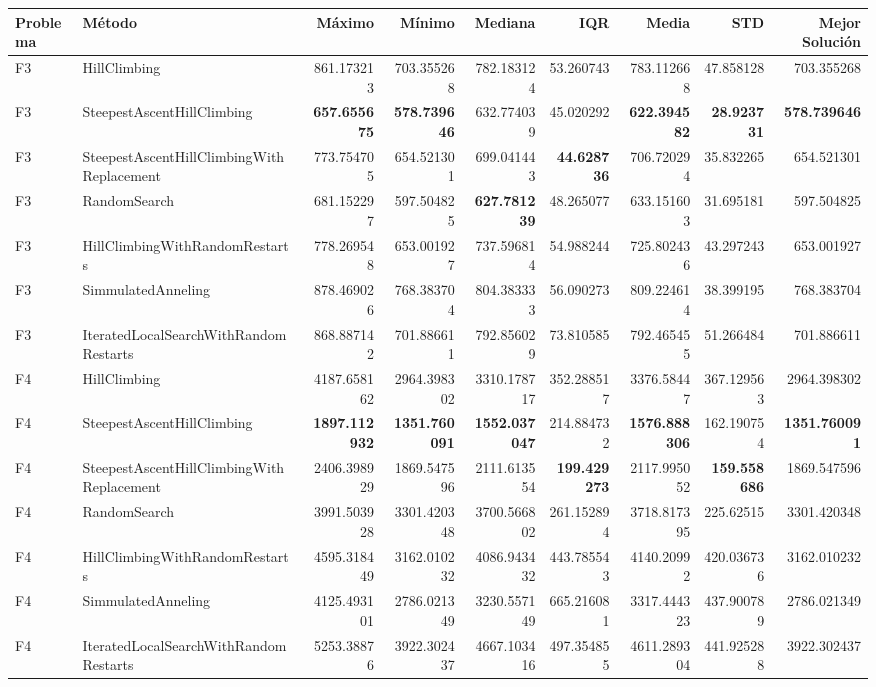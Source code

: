 \begin{tabular}{llrrrrrrr}
\toprule
Problema & Método & Máximo & Mínimo & Mediana & IQR & Media & STD & Mejor Solución \\ 
\midrule
F3 & HillClimbing & 861.173213 & 703.355268 & 782.183124 & 53.260743 & 783.112668 & 47.858128 & 703.355268 \\ 
F3 & SteepestAscentHillClimbing & \textbf{657.655675} & \textbf{578.739646} & 632.774039 & 45.020292 & \textbf{622.394582} & \textbf{28.923731} & \textbf{578.739646} \\ 
F3 & SteepestAscentHillClimbingWithReplacement & 773.754705 & 654.521301 & 699.041443 & \textbf{44.628736} & 706.720294 & 35.832265 & 654.521301 \\ 
F3 & RandomSearch & 681.152297 & 597.504825 & \textbf{627.781239} & 48.265077 & 633.151603 & 31.695181 & 597.504825 \\ 
F3 & HillClimbingWithRandomRestarts & 778.269548 & 653.001927 & 737.596814 & 54.988244 & 725.802436 & 43.297243 & 653.001927 \\ 
F3 & SimmulatedAnneling & 878.469026 & 768.383704 & 804.383333 & 56.090273 & 809.224614 & 38.399195 & 768.383704 \\ 
F3 & IteratedLocalSearchWithRandomRestarts & 868.887142 & 701.886611 & 792.856029 & 73.810585 & 792.465455 & 51.266484 & 701.886611 \\ 
F4 & HillClimbing & 4187.658162 & 2964.398302 & 3310.178717 & 352.288517 & 3376.58447 & 367.129563 & 2964.398302 \\ 
F4 & SteepestAscentHillClimbing & \textbf{1897.112932} & \textbf{1351.760091} & \textbf{1552.037047} & 214.884732 & \textbf{1576.888306} & 162.190754 & \textbf{1351.760091} \\ 
F4 & SteepestAscentHillClimbingWithReplacement & 2406.398929 & 1869.547596 & 2111.613554 & \textbf{199.429273} & 2117.995052 & \textbf{159.558686} & 1869.547596 \\ 
F4 & RandomSearch & 3991.503928 & 3301.420348 & 3700.566802 & 261.152894 & 3718.817395 & 225.62515 & 3301.420348 \\ 
F4 & HillClimbingWithRandomRestarts & 4595.318449 & 3162.010232 & 4086.943432 & 443.785543 & 4140.20992 & 420.036736 & 3162.010232 \\ 
F4 & SimmulatedAnneling & 4125.493101 & 2786.021349 & 3230.557149 & 665.216081 & 3317.444323 & 437.900789 & 2786.021349 \\ 
F4 & IteratedLocalSearchWithRandomRestarts & 5253.38876 & 3922.302437 & 4667.103416 & 497.354855 & 4611.289304 & 441.925288 & 3922.302437 \\ 

\end{tabular}
